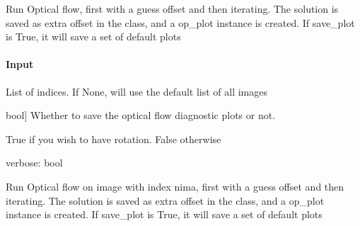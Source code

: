 \documentclass[letterpaper,10pt,english]{sphinxmanual}
\begin{document}
\begin{fulllineitems}
\begin{fulllineitems}
\label{\detokenize{api/pymusepipe:pymusepipe.align_pipe.AlignMuseDataset.run_optical_flow}}
\pysigstartsignatures
{}
\pysigstopsignatures
\sphinxAtStartPar
Run Optical flow, first with a guess offset and then iterating. The solution
is saved as extra offset in the class, and a op\_plot instance is created.
If save\_plot is True, it will save a set of default plots


\paragraph{Input}
\label{\detokenize{api/pymusepipe:id23}}\begin{description}
\sphinxAtStartPar
List of indices. If None, will use the default list of all images

\sphinxlineitem{save\_plot}{[}bool{]}
\sphinxAtStartPar
Whether to save the optical flow diagnostic plots or not.

\sphinxAtStartPar
True if you wish to have rotation. False otherwise

\end{description}

\sphinxAtStartPar
verbose: bool

\end{fulllineitems}


\begin{fulllineitems}
\label{\detokenize{api/pymusepipe:pymusepipe.align_pipe.AlignMuseDataset.run_optical_flow_ima}}
\pysigstartsignatures
{}
\pysigstopsignatures
\sphinxAtStartPar
Run Optical flow on image with index nima,
first with a guess offset and then iterating. The solution
is saved as extra offset in the class, and a op\_plot instance is created.
If save\_plot is True, it will save a set of default plots



\end{fulllineitems}
\end{fulllineitems}
\end{document}
